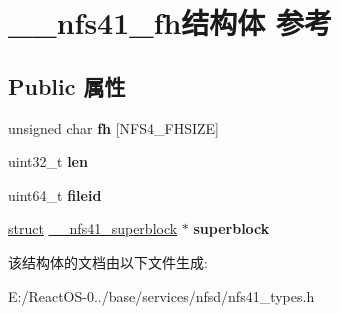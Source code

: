 \hypertarget{struct____nfs41__fh}{}\section{\+\_\+\+\_\+nfs41\+\_\+fh结构体 参考}
\label{struct____nfs41__fh}
\subsection*{Public 属性}
\begin{DoxyCompactItemize}
\item 
\mbox{\label{struct____nfs41__fh_ab231b94b0a60c9a665ef6e36ddd75699}} 
unsigned char {\bfseries fh} \mbox{[}N\+F\+S4\+\_\+\+F\+H\+S\+I\+ZE\mbox{]}
\item 
\mbox{\label{struct____nfs41__fh_a42a056ad7a4df019208ffe763d4dd87b}} 
uint32\+\_\+t {\bfseries len}
\item 
\mbox{\label{struct____nfs41__fh_abeb4a4bc2e716d8f78fa6e679ee5ddce}} 
uint64\+\_\+t {\bfseries fileid}
\item 
\mbox{\label{struct____nfs41__fh_a3bbacc6fb8069216827c66efc6a28210}} 
\hyperlink{interfacestruct}{struct} \hyperlink{struct____nfs41__superblock}{\+\_\+\+\_\+nfs41\+\_\+superblock} $\ast$ {\bfseries superblock}
\end{DoxyCompactItemize}


该结构体的文档由以下文件生成\+:\begin{DoxyCompactItemize}
\item 
E\+:/\+React\+O\+S-\/0../base/services/nfsd/nfs41\+\_\+types.\+h\end{DoxyCompactItemize}
